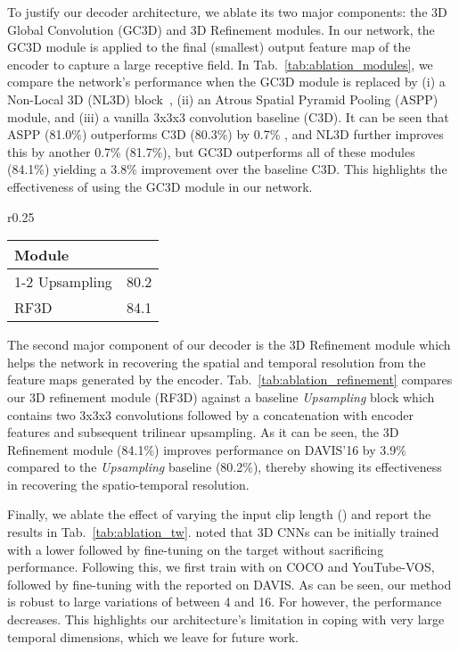 \documentclass{bmvc2k_arxiv}
\newcommand{\PAR}[1]{\vskip4pt \noindent {\bf #1~}}
\begin{document}
\PAR{Decoder:} To justify our decoder architecture, we ablate its two major components: the 3D Global Convolution (GC3D) and 3D Refinement modules.  
In our network, the GC3D module is applied to the final (smallest) output feature map of the encoder to capture a large receptive field. 
In Tab.~\ref{tab:ablation_modules}, we compare the network's performance when the GC3D module is replaced by (i) a Non-Local 3D (NL3D) block~\cite{Wang17CVPR}, (ii) an Atrous Spatial Pyramid Pooling (ASPP) module, and (iii) a vanilla 3x3x3 convolution baseline (C3D). It can be seen that ASPP (81.0\%) outperforms C3D (80.3\%) by 0.7\% , and NL3D further improves this by another 0.7\% (81.7\%), but GC3D outperforms all of these modules (84.1\%) yielding a 3.8\% improvement over the baseline C3D. This highlights the effectiveness of using the GC3D module in our network.

\begin{wraptable}{r}{0.25\textwidth}
\setlength{\tabcolsep}{5px}\footnotesize
\vspace{-19pt}\begin{tabular}[t]{l | c} \toprule
            Module &  \\
\cmidrule(lr){1-2}
                Upsampling &80.2 \\
                RF3D  &  84.1\\
\bottomrule
            \end{tabular}
\caption{Analysis of different decoder modules on DAVIS'16.}
\vspace{-8px}
\label{tab:ablation_refinement}
\end{wraptable} 
The second major component of our decoder is the 3D Refinement module which helps the network in recovering the spatial and temporal resolution from the feature maps generated by the encoder. Tab.~\ref{tab:ablation_refinement} compares our 3D refinement module (RF3D) against a baseline \textit{Upsampling} block which contains two 3x3x3 convolutions followed by a concatenation with encoder features and subsequent trilinear upsampling. As it can be seen, the 3D Refinement module (84.1\%) improves performance on DAVIS'16 by 3.9\%  compared to the \textit{Upsampling} baseline (80.2\%), thereby showing its effectiveness in recovering the spatio-temporal resolution. 


\PAR{Input Clip Length:} Finally, we ablate the effect of varying the input clip length () and report the results in Tab.~\ref{tab:ablation_tw}. \cite{Tran18CVPR} noted that 3D CNNs can be initially trained with a lower  followed by fine-tuning on the target  without sacrificing performance. Following this, we first train with  on COCO and YouTube-VOS, followed by fine-tuning with the reported  on DAVIS. 
As can be seen, our method is robust to large variations of  between 4 and 16. For  however, the performance decreases. This highlights our architecture's limitation in coping with very large temporal dimensions, which we leave for future work.
\end{document}
